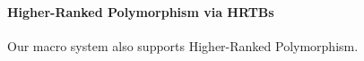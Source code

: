 \begin{frame}{\secname}
	\framesubtitle{Higher-Ranked Polymorphism via HRTBs}

	Our macro system also supports Higher-Ranked Polymorphism.


	\begin{overprint}
		\begin{figure}[h!]
		\end{figure}

		\begin{figure}[h!]
		\end{figure}
	\end{overprint}

\end{frame}
